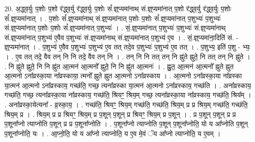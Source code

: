 \documentclass[17pt]{extarticle}
\begin{document}
20. अ॒द्ध्व॒र्युः प॒शोः प॒शो र॑द्ध्व॒र्यु र॑द्ध्व॒र्युः प॒शोः सं᳚.ज्ञ्॒प्यमा॑नाथ् सं.ज्ञ्॒प्यमा॑नात् प॒शो र॑द्ध्व॒र्यु र॑द्ध्व॒र्युः प॒शोः सं᳚.ज्ञ्॒प्यमा॑नात् । . प॒शोः सं᳚.ज्ञ्॒प्यमा॑नाथ् सं.ज्ञ्॒प्यमा॑नात् प॒शोः प॒शोः सं᳚.ज्ञ्॒प्यमा॑नात् प॒शुभ्यः॑ प॒शुभ्यः॑ सं.ज्ञ्॒प्यमा॑नात् प॒शोः प॒शोः सं᳚.ज्ञ्॒प्यमा॑नात् प॒शुभ्यः॑ । . सं॒.ज्ञ्॒प्यमा॑नात् प॒शुभ्यः॑ प॒शुभ्यः॑ सं.ज्ञ्॒प्यमा॑नाथ् सं.ज्ञ्॒प्यमा॑नात् प॒शुभ्य॑ ए॒वैव प॒शुभ्यः॑ सं.ज्ञ्॒प्यमा॑नाथ् सं.ज्ञ्॒प्यमा॑नात् प॒शुभ्य॑ ए॒व । . सं॒.ज्ञ्॒प्यमा॑ना॒दिति॑ सं. - ज्ञ्॒प्यमा॑नात् । . प॒शुभ्य॑ ए॒वैव प॒शुभ्यः॑ प॒शुभ्य॑ ए॒व तत् तदे॒व प॒शुभ्यः॑ प॒शुभ्य॑ ए॒व तत् । . प॒शुभ्य॒ इति॑ प॒शु - भ्यः॒ । . ए॒व तत् तदे॒ वैव तन् नि नि तदे॒ वैव तन् नि । . तन् नि नि तत् तन् नि ह्नु॑ते ह्नुते॒ नि तत् तन् नि ह्नु॑ते । . नि ह्नु॑ते ह्नुते॒ नि नि ह्नु॑त आ॒त्मन॑ आ॒त्मनो᳚ ह्नुते॒ नि नि ह्नु॑त आ॒त्मनः॑ । . ह्नु॒त॒ आ॒त्मन॑ आ॒त्मनो᳚ ह्नुते ह्नुत आ॒त्मनो ऽना᳚व्रस्का॒या ना᳚व्रस्काया॒ त्मनो᳚ ह्नुते ह्नुत आ॒त्मनो ऽना᳚व्रस्काय । . आ॒त्मनो ऽना᳚व्रस्का॒या ना᳚व्रस्का या॒त्मन॑ आ॒त्मनो ऽना᳚व्रस्काय॒ गच्छ॑ति॒ गच्छ॒ त्यना᳚व्रस्का या॒त्मन॑ आ॒त्मनो ऽना᳚व्रस्काय॒ गच्छ॑ति । . अना᳚व्रस्काय॒ गच्छ॑ति॒ गच्छ॒ त्यना᳚व्रस्का॒या ना᳚व्रस्काय॒ गच्छ॑ति॒ श्रियꣳ॒॒ श्रिय॒म् गच्छ॒ त्यना᳚व्रस्का॒या ना᳚व्रस्काय॒ गच्छ॑ति॒ श्रिय᳚म् । . अना᳚व्रस्का॒येत्यना᳚ - व्र॒स्का॒य॒ । . गच्छ॑ति॒ श्रियꣳ॒॒ श्रिय॒म् गच्छ॑ति॒ गच्छ॑ति॒ श्रिय॒म् प्र प्र श्रिय॒म् गच्छ॑ति॒ गच्छ॑ति॒ श्रिय॒म् प्र । . श्रिय॒म् प्र प्र श्रियꣳ॒॒ श्रिय॒म् प्र प॒शून् प॒शून् प्र श्रियꣳ॒॒ श्रिय॒म् प्र प॒शून् । . प्र प॒शून् प॒शून् प्र प्र प॒शूना᳚प्नो त्याप्नोति प॒शून् प्र प्र प॒शूना᳚प्नोति । . प॒शूना᳚प्नो त्याप्नोति प॒शून् प॒शूना᳚प्नोति॒ यो य आ᳚प्नोति प॒शून् प॒शूना᳚प्नोति॒ यः । . आ॒प्नो॒ति॒ यो य आ᳚प्नो त्याप्नोति॒ य ए॒व मे॒वं ॅय आ᳚प्नो त्याप्नोति॒ य ए॒वम् । \newline
\end{document}
